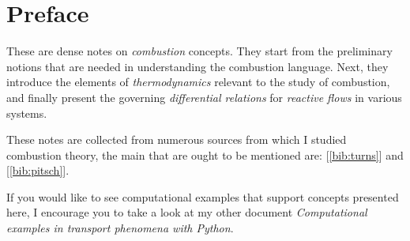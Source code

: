 \documentclass[10pt,twocolumn]{article}
\begin{document}

\setlength{\parindent}{0cm}

\vspace{10mm}

\setlength{\parindent}{0cm}


\section*{Preface}

These are dense notes on \textit{combustion} concepts. They start from the preliminary notions that are needed in understanding the combustion language. Next, they introduce the elements of \textit{thermodynamics} relevant to the study of combustion, and finally present the governing \textit{differential relations} for \textit{reactive flows} in various systems.

These notes are collected from numerous sources from which I studied combustion theory, the main that are ought to be mentioned are: [\ref{bib:turns}] and [\ref{bib:pitsch}].

If you would like to see computational examples that support concepts presented here, I encourage you to take a look at my other document \textit{Computational examples in transport phenomena with Python}.
\end{document}
